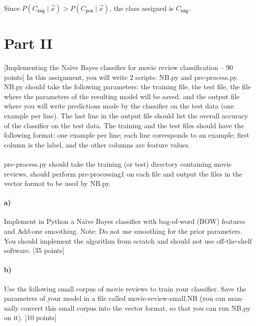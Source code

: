 \documentclass{article}
\newcommand\given[1][]{\:#1\vert\:}
\begin{document}
Since $P(C_{\texttt{neg}} \given \vec{x}) > P(C_{\texttt{pos}} \given \vec{x})$, the class assigned is $C_{\texttt{neg}}$.

\clearpage

\section*{Part II}

\paragraph{} [Implementing the Naïve Bayes classifier for movie review classification – 90 points] In this assignment, you will write 2 scripts: NB.py and pre-process.py. NB.py should take the following parameters: the training file, the test file, the file where the parameters of the resulting model will be saved, and the output file where you will write predictions made by the classifier on the test data (one example per line). The last line in the output file should list the overall accuracy of the classifier on the test data. The training and the test files should have the following format: one example per line; each line corresponds to an example; first column is the label, and the other columns are feature values.

\paragraph{} pre-process.py should take the training (or test) directory containing movie reviews, should perform pre-processing1 on each file and output the files in the vector format to be used by NB.py.

\paragraph{a)} Implement in Python a Naïve Bayes classifier with bag-of-word (BOW) features and Add-one smoothing. Note: Do not use smoothing for the prior parameters. You should implement the algorithm from scratch and should not use off-the-shelf software. [35 points]

\paragraph{b)} Use the following small corpus of movie reviews to train your classifier. Save the parameters of your model in a file called movie-review-small.NB (you can man- ually convert this small corpus into the vector format, so that you can run NB.py on it). [10 points]
\end{document}
